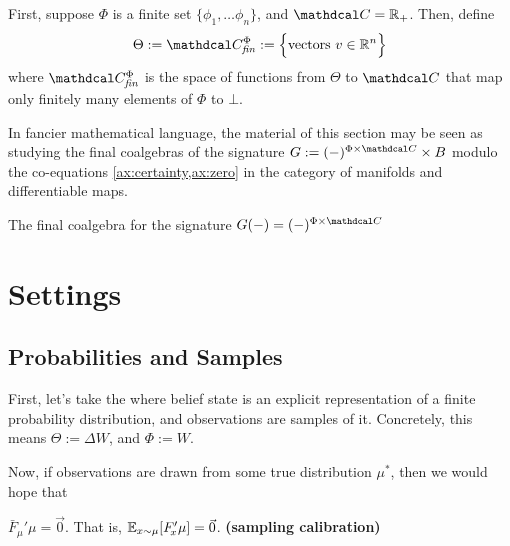 \documentclass{article}
\def\confdom{\mathdcal C}
\def\Rplus{\mathbb R_+}
\begin{document}
First, suppose $\Phi$ is a finite set $\{ \phi_1, \ldots \phi_n\}$, and $\confdom = \Rplus$. 
Then, define
\begin{align*}
	\Theta := \confdom_{\mathit{fin}}^{\Phi} := 
		\Big\{ \text{vectors}~ v \in \mathbb R^n \Big\}
\end{align*}
where 
$\confdom_{\mathit{fin}}^\Phi$ is the space of functions from $\Theta$ to $\confdom$ that map only finitely many elements of $\Phi$ to $\bot$.







In fancier mathematical language, the material of this section may be seen as studying the final coalgebras of the signature 
$
	G := (-)^{\Phi \times \confdom} \times B
$
modulo the co-equations \cref{ax:certainty,ax:zero} in the category of manifolds and differentiable maps.


\begin{prop}
	The final coalgebra for the signature $G(-) = (-)^{\Phi \times \confdom}$
\end{prop}


\section{Settings}
\subsection{Probabilities and Samples}

First, let's take the where belief state is an explicit representation of a finite probability distribution, and observations are samples of it. 
Concretely, this means $\Theta := \Delta W$, and $\Phi := W$. 

Now, if observations are drawn from some true distribution $\mu^*$, then we would hope that 

\begin{CFaxioms}
	\item  $\bar F_{\!\mu}'\mu = \vec 0$. 
	That is, $\operatorname*{\mathbb{E}}_{x \sim \mu}[ F'_{\!x}\mu] = \vec 0$.
	\hfill \textbf{(sampling calibration)} \label{ax:sample-calibration}
\end{CFaxioms}
\end{document}
